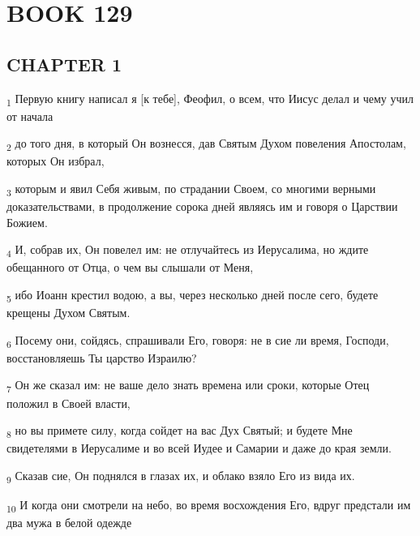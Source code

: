 \section{BOOK 129}
\subsection{CHAPTER 1}
\begin{tcolorbox}
\textsubscript{1} Первую книгу написал я [к тебе], Феофил, о всем, что Иисус делал и чему учил от начала
\end{tcolorbox}
\begin{tcolorbox}
\textsubscript{2} до того дня, в который Он вознесся, дав Святым Духом повеления Апостолам, которых Он избрал,
\end{tcolorbox}
\begin{tcolorbox}
\textsubscript{3} которым и явил Себя живым, по страдании Своем, со многими верными доказательствами, в продолжение сорока дней являясь им и говоря о Царствии Божием.
\end{tcolorbox}
\begin{tcolorbox}
\textsubscript{4} И, собрав их, Он повелел им: не отлучайтесь из Иерусалима, но ждите обещанного от Отца, о чем вы слышали от Меня,
\end{tcolorbox}
\begin{tcolorbox}
\textsubscript{5} ибо Иоанн крестил водою, а вы, через несколько дней после сего, будете крещены Духом Святым.
\end{tcolorbox}
\begin{tcolorbox}
\textsubscript{6} Посему они, сойдясь, спрашивали Его, говоря: не в сие ли время, Господи, восстановляешь Ты царство Израилю?
\end{tcolorbox}
\begin{tcolorbox}
\textsubscript{7} Он же сказал им: не ваше дело знать времена или сроки, которые Отец положил в Своей власти,
\end{tcolorbox}
\begin{tcolorbox}
\textsubscript{8} но вы примете силу, когда сойдет на вас Дух Святый; и будете Мне свидетелями в Иерусалиме и во всей Иудее и Самарии и даже до края земли.
\end{tcolorbox}
\begin{tcolorbox}
\textsubscript{9} Сказав сие, Он поднялся в глазах их, и облако взяло Его из вида их.
\end{tcolorbox}
\begin{tcolorbox}
\textsubscript{10} И когда они смотрели на небо, во время восхождения Его, вдруг предстали им два мужа в белой одежде
\end{tcolorbox}
